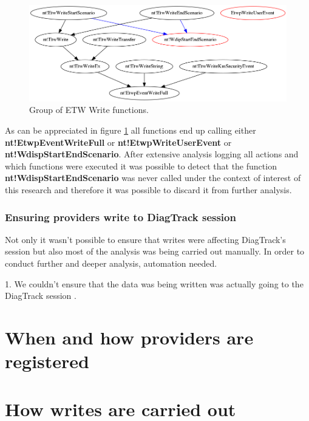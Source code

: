\begin{centering}
  \begin{figure}[H]
    \includegraphics[width=15cm]{images/write_functions.png}
    \caption[]{Group of ETW Write functions.}
    \label{fig:etw_write_group_functions}
  \end{figure}
\end{centering}

As can be appreciated in figure \ref{fig:etw_write_group_functions} all functions end up calling  either {\bfseries nt!EtwpEventWriteFull} or {\bfseries nt!EtwpWriteUserEvent} or {\bfseries nt!WdispStartEndScenario}. After extensive analysis logging all actions and which functions were executed it was possible to detect that the function {\bfseries nt!WdispStartEndScenario} was never called under the context of interest of this research and therefore it was possible to discard it from further analysis. 


\subsubsection{\bfseries{Ensuring providers write to DiagTrack session}}
Not only it wasn't possible to ensure that writes were affecting DiagTrack's session but also most of the analysis was being carried out manually. In order to conduct further and deeper analysis, automation needed.





\newpage
{\huge 1. We couldn't ensure that the data was being written was actually going to the DiagTrack session .}

\section{When and how providers are registered}
\section{How writes are carried out}
